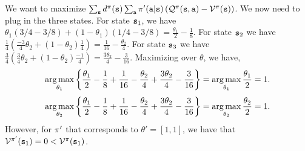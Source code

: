 \begin{example}
    We want to maximize $\sum_{{\tt s}} d^{\pi}({\tt s}) \sum_{\tt a} \pi'({\tt a}|{\tt s})\left( \mathcal{Q}^{\pi}({\tt s},{\tt a}) - \mathcal{V}^{\pi}({\tt s})\right)$. We now need to plug in the three states. For state ${\tt s}_1$, we have $\theta_1 (3/4-3/8)+(1-\theta_1)(1/4-3/8)=\frac{\theta_1}{2}-\frac{1}{8}$. For state ${\tt s}_2$ we have $\frac{1}{4}\left(\frac{-3}{4}\theta_2+(1-\theta_2)\frac{1}{4}\right)=\frac{1}{16}-\frac{\theta_2}{4}$. For state ${\tt s}_3$ we have $\frac{3}{4}\left(\frac{3}{4}\theta_2+(1-\theta_2)\frac{-1}{4}\right)=\frac{3\theta_2}{4}-\frac{3}{16}$. Maximizing over $\theta$, we have,
\begin{equation*}
        \argmax_{\theta_1} \left\{\frac{\theta_1}{2}-\frac{1}{8}+\frac{1}{16}-\frac{\theta_2}{4}+  \frac{3\theta_2}{4}-\frac{3}{16}\right\} = \argmax_{\theta_1} \frac{\theta_1}{2} = 1.
    \end{equation*}
    \begin{equation*}
          \argmax_{\theta_2} \left\{\frac{\theta_1}{2}-\frac{1}{8}+\frac{1}{16}-\frac{\theta_2}{4}+  \frac{3\theta_2}{4}-\frac{3}{16}\right\} = \argmax_{\theta_2} \frac{\theta_2}{2} = 1.
    \end{equation*}
    However, for $\pi'$ that corresponds to $\theta' = [1, 1]$, we have that $\mathcal{V}^{\pi'}({\tt s}_1) = 0 < \mathcal{V}^{\pi}({\tt s}_1)$.
\end{example}
